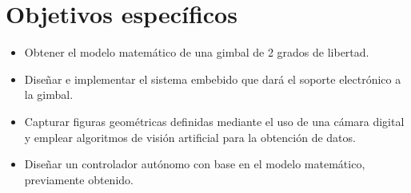 \section{Objetivos específicos}
\begin{itemize}
    \item Obtener el modelo matemático de una gimbal de 2 grados de libertad.
    \item Diseñar e implementar el sistema embebido que dará el soporte electrónico a la gimbal.
    \item Capturar figuras geométricas definidas  mediante el uso de una cámara digital y emplear algoritmos de visión artificial para la obtención de datos. 
    \item Diseñar un controlador autónomo con base en el modelo matemático, previamente obtenido.
    \end{itemize}

